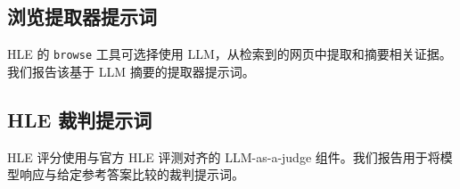\subsection{浏览提取器提示词}
\label{app:prompts:browse}
HLE 的 \texttt{browse} 工具可选择使用 LLM，从检索到的网页中提取和摘要相关证据。我们报告该基于 LLM 摘要的提取器提示词。


\subsection{HLE 裁判提示词}
\label{app:prompts:judge}
HLE 评分使用与官方 HLE 评测对齐的 LLM-as-a-judge 组件。我们报告用于将模型响应与给定参考答案比较的裁判提示词。


